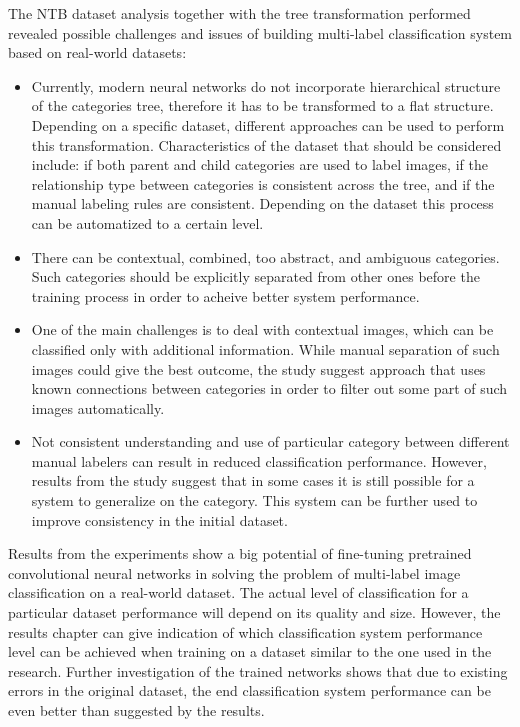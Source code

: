 The NTB dataset analysis together with the tree transformation performed revealed possible challenges and issues of building multi-label classification system based on real-world datasets:
\begin{itemize}
    \item Currently, modern neural networks do not incorporate hierarchical structure of the categories tree, therefore it has to be transformed to a flat structure. Depending on a specific dataset, different approaches can be used to perform this transformation. Characteristics of the dataset that should be considered include: if both parent and child categories are used to label images, if the relationship type between categories is consistent across the tree, and if the manual labeling rules are consistent. Depending on the dataset this process can be automatized to a certain level.
    \item There can be contextual, combined, too abstract, and ambiguous categories. Such categories should be explicitly separated from other ones before the training process in order to acheive better system performance. %
    \item One of the main challenges is to deal with contextual images, which can be classified only with additional information. While manual separation of such images could give the best outcome, the study suggest approach that uses known connections between categories in order to filter out some part of such images automatically.
    \item Not consistent understanding and use of particular category between different manual labelers can result in reduced classification performance. However, results from the study suggest that in some cases it is still possible for a system to generalize on the category. This system can be further used to improve consistency in the initial dataset. %
    
\end{itemize}

Results from the experiments show a big potential of fine-tuning pretrained convolutional neural networks in solving the problem of multi-label image classification on a real-world dataset. The actual level of classification for a particular dataset performance will depend on its quality and size. However, the results chapter can give indication of which classification system performance level can be achieved when training on a dataset similar to the one used in the research.
Further investigation of the trained networks shows that due to existing errors in the original dataset, the end classification system performance can be even better than suggested by the results.


